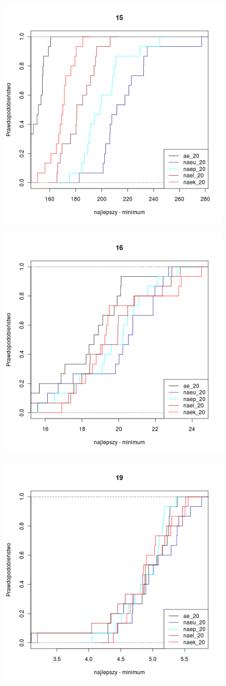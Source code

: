 \documentclass[12pt, a4paper]{article}
\begin{document}
\begin{figure}[H]
\centering
\mbox{
  {\includegraphics[width=.35\textwidth]{../pngs/20/15.png} }
  {\includegraphics[width=.35\textwidth]{../pngs/20/16.png} }
  {\includegraphics[width=.35\textwidth]{../pngs/20/19.png} }}
\end{figure}
\end{document}
